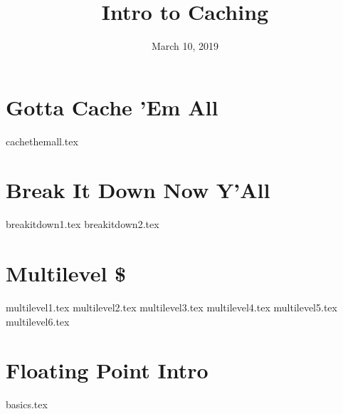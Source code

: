 \documentclass[11pt]{exam}
\title{Intro to Caching}
\date{March 10, 2019}
\begin{document}
\maketitle

\section{Gotta Cache 'Em All}
\begin{questions}
{cachethemall.tex}
\end{questions}
\newpage

\section{Break It Down Now Y'All}
\begin{questions}
{breakitdown1.tex}
{breakitdown2.tex}
\end{questions}
\newpage

\section{Multilevel \$}
\begin{questions}
{multilevel1.tex}
{multilevel2.tex}
{multilevel3.tex}
{multilevel4.tex}
{multilevel5.tex}
{multilevel6.tex}
\end{questions}
\newpage

\section{Floating Point Intro}
\begin{questions}
{basics.tex}
\end{questions}
\newpage
\end{document}
